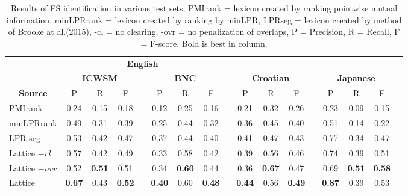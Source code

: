 \documentclass[11pt,letterpaper]{article}
\makeatletter
\def \al {al.\@ }
\makeatother
\begin{document}
 \begin{table}[!bt]
 
 \begin{center}
 \begin{tabular}{lcccccccccccccccc}

       \toprule
				& \multicolumn{7}{c}{\bf{English}} \\
       \cmidrule(lr){2-8}			
       & \multicolumn{3}{c}{\bf{ICWSM}} & &  \multicolumn{3}{c}{\bf{BNC}} & & \multicolumn{3}{c}{\bf{Croatian}}  && \multicolumn{3}{c}{\bf{Japanese}} \\
       \cmidrule(lr){2-4} \cmidrule(lr){6-8} \cmidrule(lr){10-12} \cmidrule(lr){14-16}
           \multicolumn{1}{c}{\bf{Source}}    & P & R & F &   & P & R & F &   & P & R & F &  & P & R & F \\
          \midrule 
PMIrank & 0.24& 0.15& 0.18 & & 0.12 & 0.25 & 0.16 & & 0.21 &0.32 & 0.26 & & 0.23& 0.09 & 0.15 \\ 
minLPRrank & 0.49& 0.31 & 0.39 & & 0.25& 0.44 & 0.32 & & 0.36 & 0.45 & 0.40 &  & 0.51 & 0.14 & 0.22 \\ 

LPR-seg  &0.53 & 0.42 & 0.47 && 0.37 & 0.44 & 0.40 & & 0.41 & 0.47  & 0.43 &  & 0.77 & 0.34 & 0.47 \\ 
  \midrule

	Lattice \emph{$-$cl} & 0.57& 0.42 & 0.49 & & 0.33& 0.58 & 0.42 & & 0.39 & 0.56 & 0.46 & & 0.74 & 0.39 & 0.51 \\  	 
			
	Lattice \emph{$-$ovr} & 0.52& \bf{0.51} & 0.51 & & 0.34& \bf{0.60} & 0.44& & 0.36 & \bf{0.67} & 0.47 & & 0.69 & \bf{0.51} & \bf{0.58} \\  
			
				Lattice & \bf{0.67} & 0.43 & \bf{0.52} & & \bf{0.40}& 0.60 & \bf{0.48} & &\bf{0.44} & 0.56 & \bf{0.49} & & \bf{0.87} & 0.39 & 0.53 \\ 
            \bottomrule

 \end{tabular}
  \caption{ Results of FS identification in various test sets; PMIrank = lexicon created by ranking pointwise mutual information, minLPRrank = lexicon created by ranking by minLPR, LPRseg = lexicon created by method of Brooke at \al (2015), -cl = no clearing, -ovr = no penalization of overlaps, P = Precision, R = Recall, F = F-score. Bold is best in column.}
	 \label{tab:main}

 \end{center}


 \end{table}
\end{document}
